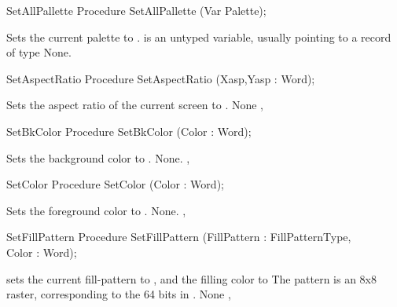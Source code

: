 \begin{procedure}{SetAllPallette}
\Declaration
Procedure SetAllPallette (Var Palette);

\Description
Sets the current palette to
.  is an untyped variable, usually pointing to a
record of type 
\Errors
None.
\SeeAlso
{}
\end{procedure}
\begin{procedure}{SetAspectRatio}
\Declaration
Procedure SetAspectRatio (Xasp,Yasp : Word);

\Description
Sets the aspect ratio of the
current screen to .
\Errors
None
\SeeAlso
{}, 
\end{procedure}
\begin{procedure}{SetBkColor}
\Declaration
Procedure SetBkColor (Color : Word);

\Description
Sets the background color to
.
\Errors
None.
\SeeAlso
{}, 
\end{procedure}
\begin{procedure}{SetColor}
\Declaration
Procedure SetColor (Color : Word);

\Description
Sets the foreground color to
.
\Errors
None.
\SeeAlso
{}, 
\end{procedure}
\begin{procedure}{SetFillPattern}
\Declaration
Procedure SetFillPattern (FillPattern : FillPatternType,\\ Color : Word);

\Description
{} sets the current fill-pattern to , and
the filling color to 
The pattern is an 8x8 raster, corresponding to the 64 bits in
.
\Errors
None
\SeeAlso
{}, 
\end{procedure}
